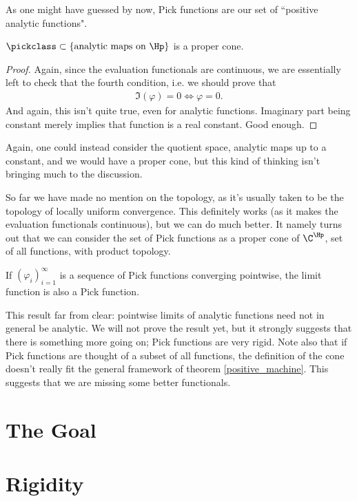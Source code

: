 As one might have guessed by now, Pick functions are our set of ``positive analytic functions".

\begin{lause}
	$\pickclass \subset \{\text{analytic maps on $\Hp$} \}$ is a proper cone.
\end{lause}
\begin{proof}
	Again, since the evaluation functionals are continuous, we are essentially left to check that the fourth condition, i.e. we should prove that
	\begin{align*}
		\Im(\varphi) = 0 \Leftrightarrow \varphi = 0.
	\end{align*}
	And again, this isn't quite true, even for analytic functions. Imaginary part being constant merely implies that function is a real constant. Good enough.
\end{proof}

Again, one could instead consider the quotient space, analytic maps up to a constant, and we would have a proper cone, but this kind of thinking isn't bringing much to the discussion.

So far we have made no mention on the topology, as it's usually taken to be the topology of locally uniform convergence. This definitely works (as it makes the evaluation functionals continuous), but we can do much better. It namely turns out that we can consider the set of Pick functions as a proper cone of $\C^{\Hp}$, set of all functions, with product topology.

\begin{prop}\label{pick_convergence}
	If $(\varphi_{i})_{i = 1}^{\infty}$ is a sequence of Pick functions converging pointwise, the limit function is also a Pick function.
\end{prop}

This result far from clear: pointwise limits of analytic functions need not in general be analytic. We will not prove the result yet, but it strongly suggests that there is something more going on; Pick functions are very rigid. Note also that if Pick functions are thought of a subset of all functions, the definition of the cone doesn't really fit the general framework of theorem \ref{positive_machine}. This suggests that we are missing some better functionals.

\section{The Goal}

\section{Rigidity}

